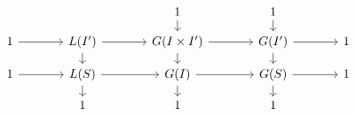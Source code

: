 \[\begin{tikzcd}[column sep=large,row sep=small]
&& 1 \arrow[d] & 1 \arrow[d]\\
1 \arrow[r] & L(I') \arrow[r] \arrow[d] & G(I\times I') \arrow[r] \arrow[d] & G(I') \arrow[r] \arrow[d] & 1\\
1 \arrow[r] & L(S) \arrow[r] \arrow[d] & G(I) \arrow[r] \arrow[d] & G(S) \arrow[r] \arrow[d] & 1\\
& 1 & 1 & 1 &
\end{tikzcd}\]
